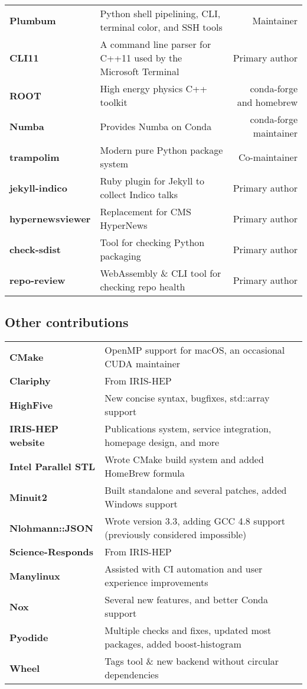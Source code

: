 \documentclass[10pt,letterpaper]{moderncv}
\begin{document}
\begin{tabularx}{\textwidth}{>{\bfseries}p{1.2in}Xr}
	Plumbum & Python shell pipelining, CLI, terminal color, and SSH tools &  Maintainer \\
	CLI11 & A command line parser for C++11 used by the Microsoft Terminal & Primary author \\
	ROOT & High energy physics C++ toolkit & conda-forge and homebrew \\
	Numba & Provides Numba on Conda & conda-forge maintainer \\
	trampolim & Modern pure Python package system & Co-maintainer \\
    jekyll-indico & Ruby plugin for Jekyll to collect Indico talks & Primary author \\
    hypernewsviewer & Replacement for CMS HyperNews & Primary author \\
    check-sdist & Tool for checking Python packaging & Primary author \\
    repo-review & WebAssembly \& CLI tool for checking repo health & Primary author \\
\end{tabularx}

\subsection{Other contributions}
\begin{tabularx}{\textwidth}{>{\bfseries}p{1.4in}X}
	CMake          & OpenMP support for macOS, an occasional CUDA maintainer  \\
	Clariphy       & From IRIS-HEP \\
	HighFive       & New concise syntax, bugfixes, std::array support  \\
	IRIS-HEP website & Publications system, service integration, homepage design, and more \\
	Intel Parallel STL & Wrote CMake build system and added HomeBrew formula \\
	Minuit2        & Built standalone and several patches, added Windows support \\
	Nlohmann::JSON & Wrote version 3.3, adding GCC 4.8 support (previously considered impossible) \\
	Science-Responds & From IRIS-HEP \\
    Manylinux & Assisted with CI automation and user experience improvements \\
    Nox            & Several new features, and better Conda support \\
    Pyodide        & Multiple checks and fixes, updated most packages, added boost-histogram \\
    Wheel          & Tags tool \& new backend without circular dependencies \\
\end{tabularx}
\end{document}
